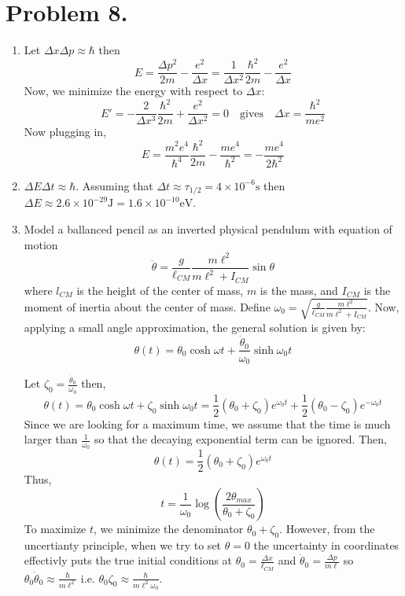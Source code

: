 \documentclass[12pt]{extarticle}
\begin{document}
 
\section*{Problem 8.}
\begin{enumerate}
\item Let $\Delta x \Delta p \approx \hbar$ then \[E = \frac{\Delta p^2}{2m} - \frac{e^2}{\Delta x} = \frac{1}{\Delta x^2} \frac{\hbar^2}{2m} - \frac{e^2}{\Delta x}\]
Now, we minimize the energy with respect to $\Delta x$: 
\[E' = - \frac{2}{\Delta x^3} \frac{\hbar^2}{2m} + \frac{e^2}{\Delta x^2} = 0 \quad \text{gives} \quad \Delta x = \frac{\hbar^2}{me^2}\]
Now plugging in, \[E = \frac{m^2 e^4}{\hbar^4} \frac{\hbar^2}{2m} - \frac{m e^4}{\hbar^2} = - \frac{m e^4}{2 \hbar^2}\] 

\item $\Delta E \Delta t \approx \hbar$. Assuming that $\Delta t \approx \tau_{1/2} = 4 \times 10^{-6} \mathrm{s}$ then $\Delta E \approx 2.6 \times 10^{-29} \mathrm{J} = 1.6 \times 10^{-10} \mathrm{eV}$.

\item Model a ballanced pencil as an inverted physical pendulum with equation of motion \[\ddot{\theta} = \frac{g}{\ell_{CM}} \frac{m \ell^2}{m \ell^2 + I_{CM}} \sin{\theta}\]
where $l_{CM}$ is the height of the center of mass, $m$ is the mass, and $I_{CM}$ is the moment of inertia about the center of mass. Define $\omega_0 =  \sqrt{\frac{g}{\ell_{CM}} \frac{m \ell^2}{m \ell^2 + I_{CM}}}$. Now, applying a small angle approximation, the general solution is given by: \[\theta(t) = \theta_0 \cosh{\omega t} + \frac{\dot{\theta}_0}{\omega_0} \sinh{\omega_0 t} \] 

Let $\zeta_0 = \frac{\dot{\theta}_0}{\omega_0}$ then,  \[\theta(t) = \theta_0 \cosh{\omega t} + \zeta_0 \sinh{\omega_0 t} = \frac{1}{2} (\theta_0 + \zeta_0) e^{\omega_0 t} + \frac{1}{2}(\theta_0 - \zeta_0) e^{-\omega_0 t} \] 
Since we are looking for a maximum time, we assume that the time is much larger than $\frac{1}{\omega_0}$ so that the decaying exponential term can be ignored. Then, \[\theta(t) = \frac{1}{2} (\theta_0 + \zeta_0) e^{\omega_0 t} \]
Thus, \[t = \frac{1}{\omega_0} \log{\left(\frac{2 \theta_{max}}{\theta_0 + \zeta_0} \right)}\] 
To maximize $t$, we minimize the denominator $\theta_0 + \zeta_0$. However, from the uncertianty principle, when we try to set $\theta = 0$ the uncertainty in coordinates effectivly puts the true initial conditions at $\theta_0 = \frac{\Delta x}{\ell_{CM}}$ and $\dot{\theta}_0 = \frac{\Delta p}{m \ell}$ so $\theta_0 \dot{\theta}_0 \approx \frac{\hbar}{m \ell^2}$ i.e. $\theta_0 \zeta_0 \approx \frac{\hbar}{m \ell^2 \omega_0}$.


\end{enumerate}
\end{document}
